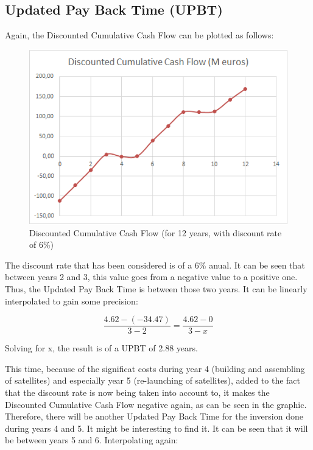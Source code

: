 \subsection{Updated Pay Back Time (UPBT)}
Again, the Discounted Cumulative Cash Flow can be plotted as follows:



\begin{figure}
	\centering
	\includegraphics{DCCF.png}
	\caption[Discounted Cumulative Cash Flow]{Discounted Cumulative Cash Flow (for 12 years, with discount rate of 6\%)}
\end{figure}


The discount rate that has been considered is of a 6\% anual. It can be seen that between years 2 and 3, this value goes from a negative value to a positive one. Thus, the Updated Pay Back Time is between those two years. It can be linearly interpolated to gain some precision:

\begin{equation}
\frac{4.62-(-34.47)}{3-2}=\frac{4.62-0}{3-x}
\end{equation}

Solving for x, the result is of a UPBT of 2.88 years.

This time, because of the significat costs during year 4 (building and assembling of satellites) and especially year 5 (re-launching of satellites), added to the fact that the discount rate is now being taken into account to, it makes the Discounted Cumulative Cash Flow negative again, as can be seen in the graphic. Therefore, there will be another Updated Pay Back Time for the inversion done during years 4 and 5. It might be interesting to find it. It can be seen that it will be between years 5 and 6. Interpolating again:


